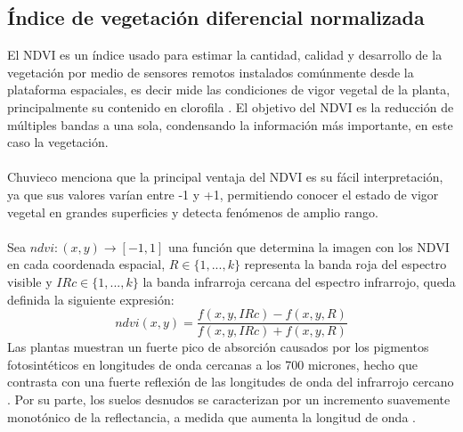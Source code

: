 \subsection{\'Indice de vegetaci\'on diferencial normalizada}\label{subsec:ndvi}
El NDVI es un \'indice usado para estimar la cantidad, calidad y desarrollo de la vegetaci\'on por medio de sensores remotos instalados com\'unmente desde la plataforma espaciales, es decir mide las condiciones de vigor vegetal de la planta, principalmente su contenido en clorofila \cite{salinero2002teledeteccion}. El objetivo del NDVI es la reducci\'on de m\'ultiples bandas a una sola, condensando la informaci\'on m\'as importante, en este caso la vegetaci\'on.\\~\\
Chuvieco \cite{salinero2002teledeteccion} menciona que la principal ventaja del NDVI es su f\'acil interpretaci\'on, ya que sus
valores var\'ian entre -1 y +1, permitiendo conocer el estado de vigor vegetal en grandes superficies y detecta fen\'omenos de amplio rango.\\~\\
Sea $ ndvi:(x,y) \longrightarrow [-1,1] $ una funci\'on que determina la imagen con los NDVI en cada coordenada espacial, $ R \in \{1,...,k\}$ representa la banda roja del espectro visible y $ IRc \in \{1,...,k\}$ la banda infrarroja cercana del espectro infrarrojo, queda definida la siguiente expresi\'on:
	\begin{equation}
	\label{e:ndvi}
	ndvi(x,y)=\dfrac{f(x,y,IRc)-f(x,y,R)}{f(x,y,IRc)+f(x,y,R)}
	\end{equation}
Las plantas muestran un fuerte pico de absorci\'on causados por los pigmentos fotosint\'eticos en longitudes de onda cercanas a los 700 micrones, hecho que contrasta con una fuerte reflexi\'on de las longitudes de onda del infrarrojo cercano \cite{salinero2002teledeteccion}. Por su parte, los suelos desnudos se caracterizan por un incremento suavemente monot\'onico de la reflectancia, a medida que aumenta la longitud de onda \cite{salinero2002teledeteccion}.

